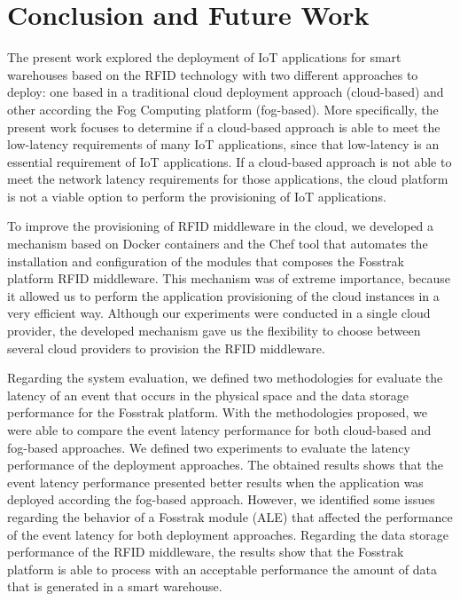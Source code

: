 

\section{Conclusion and Future Work}
\label{sec:conclusion}
The present work explored the deployment of \gls{IoT} applications for smart warehouses based on the
\gls{RFID} technology with two different approaches to deploy: one based in a traditional cloud
deployment approach (cloud-based) and other according the Fog Computing platform (fog-based). More
specifically, the present work focuses to determine if a cloud-based approach is able to meet the
low-latency requirements of many \gls{IoT} applications, since that low-latency is an essential
requirement of \gls{IoT} applications. If a cloud-based approach is not able to meet the network latency
requirements for those applications, the cloud platform is not a viable option to perform the
provisioning of \gls{IoT} applications.

To improve the provisioning of \gls{RFID} middleware in the cloud, we developed a mechanism based on
Docker containers and the Chef tool that automates the installation and configuration of the modules
that composes the Fosstrak platform \gls{RFID} middleware. This mechanism was of extreme
importance, because it allowed us to perform the application provisioning of the cloud instances in
a very efficient way. Although our experiments were conducted in a single cloud provider, the developed
mechanism gave us the flexibility to choose between several cloud providers to provision the
\gls{RFID} middleware.

Regarding the system evaluation, we defined two methodologies for evaluate the latency of an event that
occurs in the physical space and the data storage performance for the Fosstrak platform. With the
methodologies proposed, we were able to compare the event latency performance for both cloud-based
and fog-based approaches. We defined two experiments to evaluate the latency performance of the
deployment approaches. The obtained results shows that the event latency performance presented better
results when the application was deployed according the fog-based approach. However, we identified
some issues regarding the behavior of a Fosstrak module (\gls{ALE}) that affected the performance
of the event latency for both deployment approaches. Regarding the data storage performance of the
RFID middleware, the results show that the Fosstrak platform is able to process with an acceptable
performance the amount of data that is generated in a smart warehouse.

